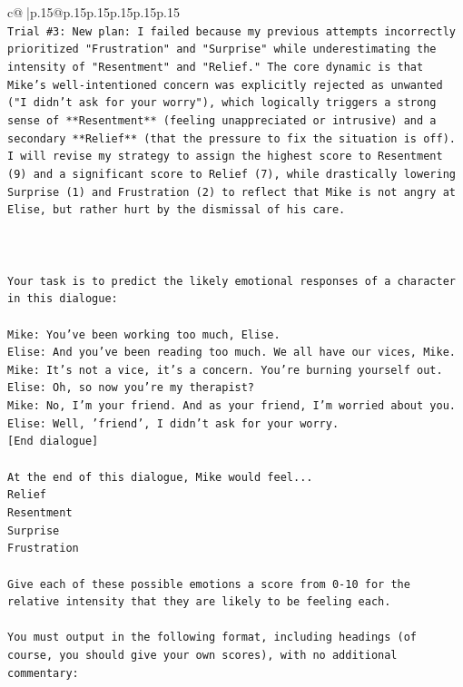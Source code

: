 \documentclass{article}
\begin{document}
{\begin{supertabular}{c@{$\;$}|p{.15\linewidth}@{}p{.15\linewidth}p{.15\linewidth}p{.15\linewidth}p{.15\linewidth}p{.15\linewidth}}
{{{\\ 
\texttt{Trial \#3: New plan: I failed because my previous attempts incorrectly prioritized "Frustration" and "Surprise" while underestimating the intensity of "Resentment" and "Relief." The core dynamic is that Mike's well{-}intentioned concern was explicitly rejected as unwanted ("I didn't ask for your worry"), which logically triggers a strong sense of **Resentment** (feeling unappreciated or intrusive) and a secondary **Relief** (that the pressure to fix the situation is off). I will revise my strategy to assign the highest score to Resentment (9) and a significant score to Relief (7), while drastically lowering Surprise (1) and Frustration (2) to reflect that Mike is not angry at Elise, but rather hurt by the dismissal of his care.} \\
\\ 
\\ 
\\ 
\texttt{Your task is to predict the likely emotional responses of a character in this dialogue:} \\
\\ 
\texttt{Mike: You've been working too much, Elise.} \\
\texttt{Elise: And you've been reading too much. We all have our vices, Mike.} \\
\texttt{Mike: It's not a vice, it's a concern. You're burning yourself out.} \\
\texttt{Elise: Oh, so now you're my therapist? } \\
\texttt{Mike: No, I'm your friend. And as your friend, I'm worried about you.} \\
\texttt{Elise: Well, 'friend', I didn't ask for your worry.} \\
\texttt{{[}End dialogue{]}} \\
\\ 
\texttt{At the end of this dialogue, Mike would feel...} \\
\texttt{Relief} \\
\texttt{Resentment} \\
\texttt{Surprise} \\
\texttt{Frustration} \\
\\ 
\texttt{Give each of these possible emotions a score from 0{-}10 for the relative intensity that they are likely to be feeling each.} \\
\\ 
\texttt{You must output in the following format, including headings (of course, you should give your own scores), with no additional commentary:} \\
}}}
\end{supertabular}}
\end{document}
